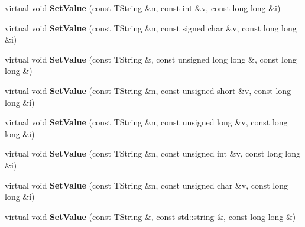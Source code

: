 \begin{DoxyCompactItemize}
\item 
\hypertarget{class_h_a_l_1_1_analysis_data_aaddff4f1a41b2311b5f59a4eb4eb7a41}{virtual void {\bfseries Set\-Value} (const T\-String \&n, const int \&v, const long long \&i)}\label{class_h_a_l_1_1_analysis_data_aaddff4f1a41b2311b5f59a4eb4eb7a41}

\item 
\hypertarget{class_h_a_l_1_1_analysis_data_acea99cc8c68cf2a9d5f82da7e0d33202}{virtual void {\bfseries Set\-Value} (const T\-String \&n, const signed char \&v, const long long \&i)}\label{class_h_a_l_1_1_analysis_data_acea99cc8c68cf2a9d5f82da7e0d33202}

\item 
\hypertarget{class_h_a_l_1_1_analysis_data_a20938ad3fcd255b41f894e44b3e363f8}{virtual void {\bfseries Set\-Value} (const T\-String \&, const unsigned long long \&, const long long \&)}\label{class_h_a_l_1_1_analysis_data_a20938ad3fcd255b41f894e44b3e363f8}

\item 
\hypertarget{class_h_a_l_1_1_analysis_data_a8d61e54fe6022a58837468e1059a7e80}{virtual void {\bfseries Set\-Value} (const T\-String \&n, const unsigned short \&v, const long long \&i)}\label{class_h_a_l_1_1_analysis_data_a8d61e54fe6022a58837468e1059a7e80}

\item 
\hypertarget{class_h_a_l_1_1_analysis_data_a2af1428a8feebf6769cb30dd656d4b1e}{virtual void {\bfseries Set\-Value} (const T\-String \&n, const unsigned long \&v, const long long \&i)}\label{class_h_a_l_1_1_analysis_data_a2af1428a8feebf6769cb30dd656d4b1e}

\item 
\hypertarget{class_h_a_l_1_1_analysis_data_a446ed8d103e405b5028a9cebeae11bdf}{virtual void {\bfseries Set\-Value} (const T\-String \&n, const unsigned int \&v, const long long \&i)}\label{class_h_a_l_1_1_analysis_data_a446ed8d103e405b5028a9cebeae11bdf}

\item 
\hypertarget{class_h_a_l_1_1_analysis_data_af11d8522043ee9ddebea6beddfafdb1f}{virtual void {\bfseries Set\-Value} (const T\-String \&n, const unsigned char \&v, const long long \&i)}\label{class_h_a_l_1_1_analysis_data_af11d8522043ee9ddebea6beddfafdb1f}

\item 
\hypertarget{class_h_a_l_1_1_analysis_data_a2c1fe18ae83a39d8278630896e3b20cf}{virtual void {\bfseries Set\-Value} (const T\-String \&, const std\-::string \&, const long long \&)}\label{class_h_a_l_1_1_analysis_data_a2c1fe18ae83a39d8278630896e3b20cf}


\end{DoxyCompactItemize}
